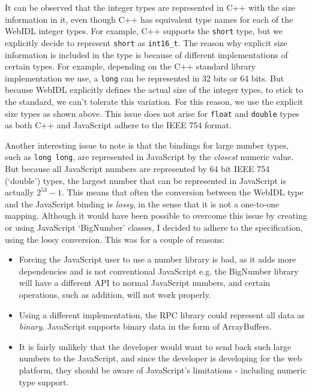 It can be observed that the integer types are represented in C++ with the size information in it, even though C++ has equivalent type names for each of the WebIDL integer types. For example, C++ supports the \lstinline{short} type, but we explicitly decide to represent \lstinline{short} as \lstinline{int16_t}. The reason why explicit size information is included in the type is because of different implementations of certain types. For example, depending on the C++ standard library implementation we use, a \lstinline{long} can be represented in 32 bits or 64 bits. But because WebIDL explicitly defines the actual size of the integer types, to stick to the standard, we can't tolerate this variation. For this reason, we use the explicit size types as shown above. This issue does not arise for \lstinline{float} and \lstinline{double} types as both C++ and JavaScript adhere to the IEEE 754 format.

Another interesting issue to note is that the bindings for large number types, such as \lstinline{long long}, are represented in JavaScript by the \emph{closest} numeric value. But because all JavaScript numbers are represented by 64 bit IEEE 754 (`double') types, the largest number that can be represented in JavaScript is actually $2^{53}-1$. This means that often the conversion between the WebIDL type and the JavaScript binding is \emph{lossy}, in the sense that it is not a one-to-one mapping. Although it would have been possible to overcome this issue by creating or using JavaScript `BigNumber' classes, I decided to adhere to the specification, using the lossy conversion. This was for a couple of reasons:

\begin{itemize}
	\item Forcing the JavaScript user to use a number library is bad, as it adds more dependencies and is not conventional JavaScript e.g. the BigNumber library will have a different API to normal JavaScript numbers, and certain operations, such as addition, will not work properly.
	\item Using a different implementation, the RPC library could represent all data as \emph{binary}. JavaScript supports binary data in the form of ArrayBuffers.
	\item It is fairly unlikely that the developer would want to send back such large numbers to the JavaScript, and since the developer is developing for the web platform, they should be aware of JavaScript's limitations - including numeric type support.
\end{itemize}

